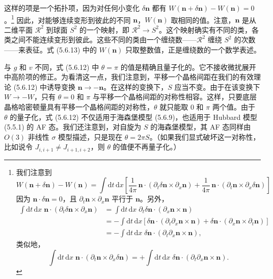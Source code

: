这样的项是一个拓扑项，因为对任何小变化 $\delta\pmb{n}$ 都有 $W(\pmb{n}+\delta\pmb{n})-W(\pmb{n})=0$。\footnote{我们注意到
\begin{equation*}
W(\pmb{n}+\delta\pmb{n})-W(\pmb{n})=\int \mathrm{d}t\,\mathrm{d}x\left[\frac{1}{4\pi}\,\pmb{n}\cdot(\partial_{t}\delta\pmb{n}\times\partial_{x}\pmb{n})+\frac{1}{4\pi}\,\pmb{n}\cdot(\partial_{t}\pmb{n}\times\partial_{x}\delta\pmb{n})\right]
\end{equation*}
因为 $\pmb{n}\cdot\delta\pmb{n}=0$，且 $\partial_{t}\pmb{n}\times\partial_{x}\pmb{n}$ 平行于 $\pmb{n}$。另外，
\begin{align*}
\int \mathrm{d}t\,\mathrm{d}x\;\pmb{n}\cdot(\partial_{t}\delta\pmb{n}\times\partial_{x}\pmb{n})&=\int \mathrm{d}t\,\mathrm{d}x\;\partial_{t}\delta\pmb{n}\cdot(\partial_{x}\pmb{n}\times\pmb{n})\\
&=-\int \mathrm{d}t\,\mathrm{d}x\left[\delta\pmb{n}\cdot(\partial_{t}\partial_{x}\pmb{n}\times\pmb{n})+\delta\pmb{n}\cdot(\partial_{x}\pmb{n}\times\partial_{t}\pmb{n})\right]\\
&=-\int \mathrm{d}t\,\mathrm{d}x\;\delta\pmb{n}\cdot(\partial_{t}\partial_{x}\pmb{n}\times\pmb{n}),
\end{align*}
类似地，
\begin{equation*}
\int \mathrm{d}t\,\mathrm{d}x\;\pmb{n}\cdot(\partial_{t}\pmb{n}\times\partial_{x}\delta\pmb{n})=+\int \mathrm{d}t\,\mathrm{d}x\;\delta\pmb{n}\cdot(\partial_{t}\partial_{x}\pmb{n}\times\pmb{n}).
\end{equation*}} 因此，对能够连续变形到彼此的不同 $\pmb{n}$，$W(\pmb{n})$ 取相同的值。注意，$\pmb{n}$ 是从二维平面 $\mathcal{R}^{2}$ 到球面 $S^{2}$ 的一个映射，即 $\mathcal{R}^{2}\to S^{2}$。这个映射确实有不同的类，各类之间不能连续变形到彼此。这些不同的类由一个缠绕数——$\mathcal{R}^{2}$ 缠绕 $S^{2}$ 的次数——来表征。式 (5.6.13) 中的 $W(\pmb{n})$ 只取整数值，正是缠绕数的一个数学表述。

与 $g$ 和 $v$ 不同，式 (5.6.12) 中 $\theta=\pi$ 的值是精确且量子化的。它不接收微扰展开中高阶项的修正。为看清这一点，我们注意到，平移一个晶格间距在我们的有效理论 (5.6.12) 中诱导变换 $\pmb{n}\to-\pmb{n}$。在这样的变换下，$S$ 应当不变。由于在该变换下 $W\to -W$，只有 $\theta=0$ 和 $\pi$ 与平移一个晶格间距的对称性相容。这样，只要底层晶格哈密顿量具有平移一个晶格间距的对称性，$\theta$ 就只能取 0 和 $\pi$ 两个值。由于 $\theta$ 的量子化，式 (5.6.12) 不仅适用于海森堡模型 (5.6.9)，也适用于 Hubbard 模型 (5.5.1) 的 AF 态。我们还注意到，对自旋为 $S$ 的海森堡模型，其 AF 态同样由 $O(3)$ 非线性 $\sigma$ 模型描述，只是现在 $\theta=2\pi S$。（如果我们显式破坏这一对称性，比如说令 $J_{i,i+1}\neq J_{i+1,i+2}$，则 $\theta$ 的值便不再量子化。）

